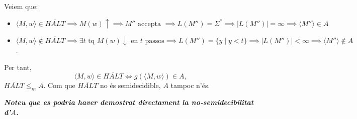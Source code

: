 \documentclass{article}
\begin{document}
Veiem que:
\begin{itemize}
    \item $\langle M,w\rangle \in \overline{HALT} \implies M(w) \uparrow \implies  M'' \text{ accepta } \implies L(M'') = \Sigma^* \implies |L(M'')| = \infty \implies \langle M'' \rangle \in A$
    \item $\langle M,w\rangle \notin \overline{HALT} \implies \exists t \text{ tq } M(w) \downarrow \text{ en } t \text{ passos} \implies L(M'') = \{y \mid y < t\} \implies |L(M'')| < \infty \implies \langle M'' \rangle \notin A$.
\end{itemize}
Per tant,
$$
\langle M,w\rangle \in \overline{HALT} \iff g(\langle M,w\rangle) \in A,
$$
$\overline{HALT} \leq_m A$. Com que $\overline{HALT}$ no és semidecidible, $A$ tampoc n'és.
\vspace{1em}
\vspace{1em}
\vspace{1em}

\textcolor{OliveGreen}{\textit{\textbf{Noteu que es podria haver demostrat directament la no-semidecibilitat d'$A$.}}}
\end{document}
